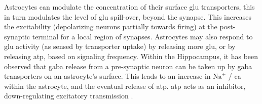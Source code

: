 \documentclass[conference]{IEEEtran}
\newcommand{\ca}{\gls{ca}\textrm{ }}
\newcommand{\na}{$\textrm{Na}^+$\textrm{ }}
\newcommand{\ipt}{\gls{ipt}\textrm{ }}
\newcommand{\kp}{\gls{kp}\textrm{ }}
\newcommand{\asvgf}[4]{
	\begin{figure}[htbp]
    	\centering
		\adjustbox{max width=#4\linewidth}{}
        \caption{#2.}
        \label{#3}
	\end{figure}
}
\begin{document}
Astrocytes can modulate the concentration of their surface glu transporters,
this in turn modulates the level of glu spill-over, beyond the synapse. This
increases the excitability (depolarizing neurons partially towards firing)
at the post-synaptic terminal for a local region of synapses. Astrocytes may
also respond to \gls{glu} activity (as sensed by transporter uptake) by
releasing more \gls{glu}, or by releasing \gls{atp}, based on signaling
frequency. Within the Hippocampus, it has been observed that \gls{gaba}
release from a pre-synaptic neuron can be taken up by \gls{gaba}
transporters on an astrocyte's surface. This leads to an increase in \na /
\ca within the astrocyte, and the eventual release of \gls{atp}. \Gls{atp}
acts as an inhibitor, down-regulating excitatory transmission
\parencite{mederos_2018}.




\end{document}
